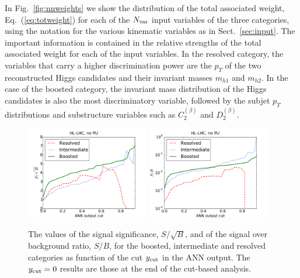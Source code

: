 %
In Fig.~\ref{fig:nnweights} we show
the distribution of the total associated weight,
Eq.~(\ref{eq:totweight}) for each of the $N_{\rm var}$ input
variables of the three categories, using the
notation for the various kinematic variables
as in Sect.~\ref{sec:input}.
%
The important information
is contained in the relative strengths of the total associated weight
for each of the input variables.
%
In the 
resolved category, the variables that carry 
a higher discrimination power
are the $p_T$ of the two reconstructed Higgs candidates and
their invariant masses $m_{h1}$ and $m_{h2}$.
%
In the case of the boosted category, the invariant mass distribution
of the Higgs candidates is also the most discriminatory
variable, followed by the subjet $p_T$ distributions and
substructure variables such as $C_2^{(\beta)}$ and
$D_2^{(\beta)}$.




\begin{figure}[t]
\begin{center}
\includegraphics[width=0.48\textwidth]{plots/ssb_noPU.pdf}
\includegraphics[width=0.48\textwidth]{plots/sb_noPU.pdf}
\caption{\small
  The values of the signal significance, $S/\sqrt{B}$, and of the
  signal over background ratio, $S/B$, for the boosted, intermediate
  and resolved categories as  function of the cut
  $y_{\rm cut}$ in the ANN output.
  The $y_{\rm cut}=0$
  results are those at the end of the cut-based
  analysis.
}
\label{fig:sb_mva}
\end{center}
\end{figure}

